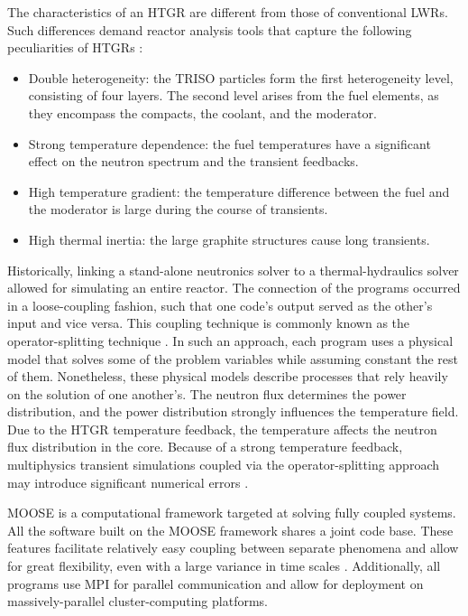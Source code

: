 The characteristics of an \gls{HTGR} are different from those of conventional \glspl{LWR}.
Such differences demand reactor analysis tools that capture the following peculiarities of \glspl{HTGR} \cite{rohde_development_2012}\cite{bostelmann_criticality_2016}:
\begin{itemize}
\item Double heterogeneity: the TRISO particles form the first heterogeneity level, consisting of four
layers.
The second level arises from the fuel elements, as they encompass the compacts, the coolant, and the moderator.
\item Strong temperature dependence: the fuel temperatures have a significant effect on the neutron spectrum and the transient feedbacks.
\item High temperature gradient: the temperature difference between the fuel and the moderator is large during the course of transients.
\item High thermal inertia: the large graphite structures cause long transients.
\end{itemize}

Historically, linking a stand-alone neutronics solver to a thermal-hydraulics solver allowed for simulating an entire reactor.
The connection of the programs occurred in a loose-coupling fashion, such that one code's output served as the other's input and vice versa.
This coupling technique is commonly known as the operator-splitting technique \cite{ragusa_consistent_2009}.
In such an approach, each program uses a physical model that solves some of the problem variables while assuming constant the rest of them.
Nonetheless, these physical models describe processes that rely heavily on the solution of one another's.
The neutron flux determines the power distribution, and the power distribution strongly influences the temperature field.
Due to the \gls{HTGR} temperature feedback, the temperature affects the neutron flux distribution in the core.
Because of a strong temperature feedback, multiphysics transient simulations coupled via the operator-splitting approach may introduce significant numerical errors \cite{park_tightly_2010}\cite{ragusa_consistent_2009}.

\gls{MOOSE} \cite{gaston_moose_2009} is a computational framework targeted at solving fully coupled systems.
All the software built on the \gls{MOOSE} framework shares a joint code base.
These features facilitate relatively easy coupling between separate phenomena and allow for great flexibility, even with a large variance in time scales \cite{novak_pronghorn_2018}.
Additionally, all programs use \gls{MPI} for parallel communication and allow for deployment on massively-parallel cluster-computing platforms.


